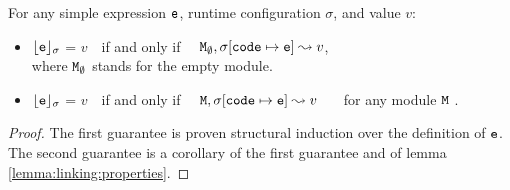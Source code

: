 \begin{lemma}
For any simple expression ${\mbox{\tt{e}}}$, runtime configuration $\sigma$, and value $v$:

\begin{itemize}
     \item 
  ${\lfloor{ {\ensuremath{{\mbox{\tt{e}}}}}}\rfloor_{\sigma}}$ = $v$\ \     if and only if \ \ ${\mbox{\tt{\ensuremath{{\mbox{\tt{M}}}}}}}_\emptyset, \sigma[{\mbox{\tt{code}}}\mapsto {\mbox{\tt{e}}}] \leadsto v$,\\
  where ${\mbox{\tt{\ensuremath{{\mbox{\tt{M}}}}}}}_\emptyset$ stands for the empty module.
  \item
   ${\lfloor{ {\ensuremath{{\mbox{\tt{e}}}}}}\rfloor_{\sigma}}$ = $v$\ \     if and only if \ \ ${\mbox{\tt{\ensuremath{{\mbox{\tt{M}}}}}}}, \sigma[{\mbox{\tt{code}}}\mapsto {\mbox{\tt{e}}}] \leadsto v$ \ \ \ for any module ${\mbox{\tt{\ensuremath{{\mbox{\tt{M}}}}}}}$ .
   \end{itemize}
   \end{lemma}
   
   \begin{proof} The  first guarantee is proven structural induction  over the definition of ${\mbox{\tt{e}}}$.
   The second guarantee  is a corollary of the first guarantee  and of lemma \ref{lemma:linking:properties}.\end{proof}


